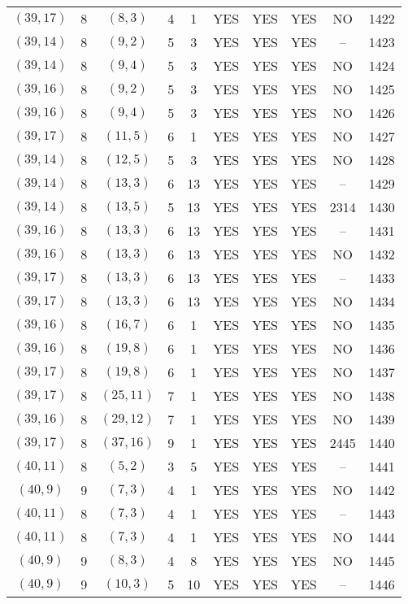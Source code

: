 \begin{longtable}{|c|c|c|c|c|c|c|c|c|c|}
$(39, 17)$ & 8 & $(8, 3)$ & 4 & 1 & YES & YES & YES & NO & 1422\\
$(39, 14)$ & 8 & $(9, 2)$ & 5 & 3 & YES & YES & YES & -- & 1423\\
$(39, 14)$ & 8 & $(9, 4)$ & 5 & 3 & YES & YES & YES & NO & 1424\\
$(39, 16)$ & 8 & $(9, 2)$ & 5 & 3 & YES & YES & YES & NO & 1425\\
$(39, 16)$ & 8 & $(9, 4)$ & 5 & 3 & YES & YES & YES & NO & 1426\\
$(39, 17)$ & 8 & $(11, 5)$ & 6 & 1 & YES & YES & YES & NO & 1427\\
$(39, 14)$ & 8 & $(12, 5)$ & 5 & 3 & YES & YES & YES & NO & 1428\\
$(39, 14)$ & 8 & $(13, 3)$ & 6 & 13 & YES & YES & YES & -- & 1429\\
$(39, 14)$ & 8 & $(13, 5)$ & 5 & 13 & YES & YES & YES & 2314 & 1430\\
$(39, 16)$ & 8 & $(13, 3)$ & 6 & 13 & YES & YES & YES & -- & 1431\\
$(39, 16)$ & 8 & $(13, 3)$ & 6 & 13 & YES & YES & YES & NO & 1432\\
$(39, 17)$ & 8 & $(13, 3)$ & 6 & 13 & YES & YES & YES & -- & 1433\\
$(39, 17)$ & 8 & $(13, 3)$ & 6 & 13 & YES & YES & YES & NO & 1434\\
$(39, 16)$ & 8 & $(16, 7)$ & 6 & 1 & YES & YES & YES & NO & 1435\\
$(39, 16)$ & 8 & $(19, 8)$ & 6 & 1 & YES & YES & YES & NO & 1436\\
$(39, 17)$ & 8 & $(19, 8)$ & 6 & 1 & YES & YES & YES & NO & 1437\\
$(39, 17)$ & 8 & $(25, 11)$ & 7 & 1 & YES & YES & YES & NO & 1438\\
$(39, 16)$ & 8 & $(29, 12)$ & 7 & 1 & YES & YES & YES & NO & 1439\\
$(39, 17)$ & 8 & $(37, 16)$ & 9 & 1 & YES & YES & YES & 2445 & 1440\\
$(40, 11)$ & 8 & $(5, 2)$ & 3 & 5 & YES & YES & YES & -- & 1441\\
$(40, 9)$ & 9 & $(7, 3)$ & 4 & 1 & YES & YES & YES & NO & 1442\\
$(40, 11)$ & 8 & $(7, 3)$ & 4 & 1 & YES & YES & YES & -- & 1443\\
$(40, 11)$ & 8 & $(7, 3)$ & 4 & 1 & YES & YES & YES & NO & 1444\\
$(40, 9)$ & 9 & $(8, 3)$ & 4 & 8 & YES & YES & YES & NO & 1445\\
$(40, 9)$ & 9 & $(10, 3)$ & 5 & 10 & YES & YES & YES & -- & 1446\\

\end{longtable}
